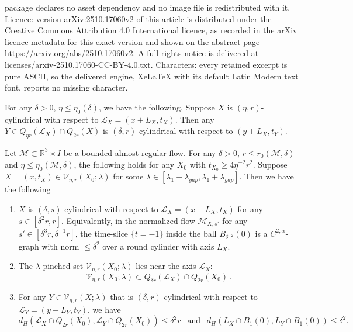 \documentclass[10pt,a4paper]{amsart}
\newcommand{\RR}{\mathds{R}}
\newcommand{\cL}{\mathcal{L}}
\newcommand{\cM}{\mathcal{M}}
\newcommand{\cV}{\mathcal{V}}
\begin{document}
package declares no asset dependency and no image file is redistributed with it. Licence: version arXiv:2510.17060v2 of this article is distributed under the Creative Commons Attribution 4.0 International licence, as recorded in the arXiv licence metadata for this exact version and shown on the abstract page https://arxiv.org/abs/2510.17060v2. A full rights notice is delivered at licenses/arxiv-2510.17060-CC-BY-4.0.txt. Characters: every retained excerpt is pure ASCII, so the delivered engine, XeLaTeX with its default Latin Modern text font, reports no missing character.
\begin{lemma}\label{l:near cylindrical also cylindrical}
    For any $\delta>0$, $\eta\le \eta_0(\delta)$, we have the following. Suppose $X$ is $(\eta,r)$-cylindrical with respect to $\cL_X = (x+L_X,t_X)$. Then any $Y \in Q_{\eta r}(\cL_X) \cap Q_{2r}(X)$ is $(\delta,r)$-cylindrical with respect to $(y+L_X, t_Y)$.  
\end{lemma}

\begin{proposition}\label{p:almost cylindrical rigidity}
    Let $\cM \subset \RR^3 \times I$ be a bounded almost regular flow. For any $\delta>0$, $r\le r_0(\cM,\delta)$ and $\eta\le \eta_0(\cM,\delta)$, the following holds for any $X_0$ with $t_{X_0} \ge 4\eta^{-2}r^2$. Suppose $ X = (x,t_X)\in \cV_{\eta,r}(X_0;\lambda)$ for some $\lambda \in [\lambda_1-\lambda_{gap},\lambda_1 +  \lambda_{gap}]$. Then we have the following
    \begin{enumerate}
        \item $X$ is $(\delta,s)$-cylindrical with respect to $\cL_{X} =(x+L_X,t_X)$ for any $s\in [\delta^2 r,r]$. Equivalently, in the normalized flow $\cM_{X,s'}$ for any $s'\in[\delta^3 r, \delta^{-1}r]$, the time-slice $\{t=-1\}$ inside the ball $B_{\delta^{-2}}(0)$ is a $C^{2,\alpha}$-graph with norm $\le\delta^2$ over a round cylinder with axis $L_X$.
        \item The $\lambda$-pinched set $\cV_{\eta,r}(X_0;\lambda)$ lies near the axis $\cL_{X}$:
        \begin{equation*}
            \cV_{\eta,r}(X_0;\lambda)\subset Q_{\delta r}(\cL_X)\cap Q_{2r}(X_0)\,.
        \end{equation*}
        \item For any $Y \in \cV_{\eta,r}(X;\lambda)$ that is $(\delta,r)$-cylindrical with respect to $\cL_Y=(y+L_Y,t_Y)$, we have
        \begin{equation*}
            d_H(\cL_X \cap Q_{2r}(X_0) , \cL_Y \cap Q_{2r}(X_0)) \le \delta^2 r ~~ \text{ and } ~~ d_H(L_X\cap B_1(0), L_Y \cap B_1(0)) \le \delta^2.
        \end{equation*}
    \end{enumerate}
\end{proposition}
\end{document}

